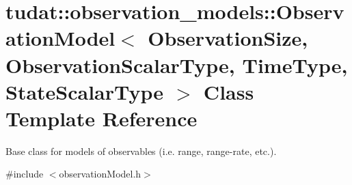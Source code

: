 \hypertarget{classtudat_1_1observation__models_1_1ObservationModel}{}\section{tudat\+:\+:observation\+\_\+models\+:\+:Observation\+Model$<$ Observation\+Size, Observation\+Scalar\+Type, Time\+Type, State\+Scalar\+Type $>$ Class Template Reference}
\label{classtudat_1_1observation__models_1_1ObservationModel}


Base class for models of observables (i.\+e. range, range-\/rate, etc.).  




{\ttfamily \#include $<$observation\+Model.\+h$>$}


